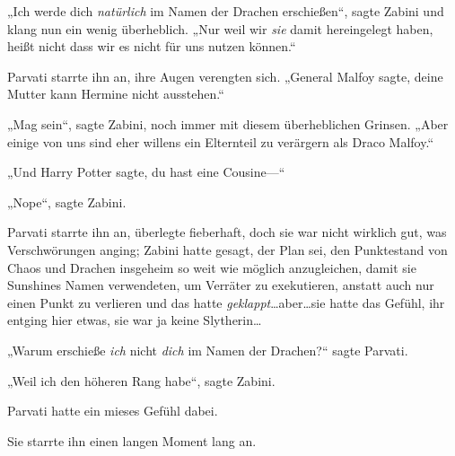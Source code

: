 „Ich werde dich \emph{natürlich} im Namen der Drachen erschießen“, sagte Zabini und klang nun ein wenig überheblich. „Nur weil wir \emph{sie} damit hereingelegt haben, heißt nicht dass wir es nicht für uns nutzen können.“

Parvati starrte ihn an, ihre Augen verengten sich. „General Malfoy sagte, deine Mutter kann Hermine nicht ausstehen.“

„Mag sein“, sagte Zabini, noch immer mit diesem überheblichen Grinsen. „Aber einige von uns sind eher willens ein Elternteil zu verärgern als Draco Malfoy.“

„Und Harry Potter sagte, du hast eine Cousine—“

„Nope“, sagte Zabini.

Parvati starrte ihn an, überlegte fieberhaft, doch sie war nicht wirklich gut, was Verschwörungen anging; Zabini hatte gesagt, der Plan sei, den Punktestand von Chaos und Drachen insgeheim so weit wie möglich anzugleichen, damit sie Sunshines Namen verwendeten, um Verräter zu exekutieren, anstatt auch nur einen Punkt zu verlieren und das hatte \emph{geklappt}…aber…sie hatte das Gefühl, ihr entging hier etwas, sie war ja keine Slytherin…

„Warum erschieße \emph{ich} nicht \emph{dich} im Namen der Drachen?“ sagte Parvati.

„Weil ich den höheren Rang habe“, sagte Zabini.

Parvati hatte ein mieses Gefühl dabei.

Sie starrte ihn einen langen Moment lang an.

